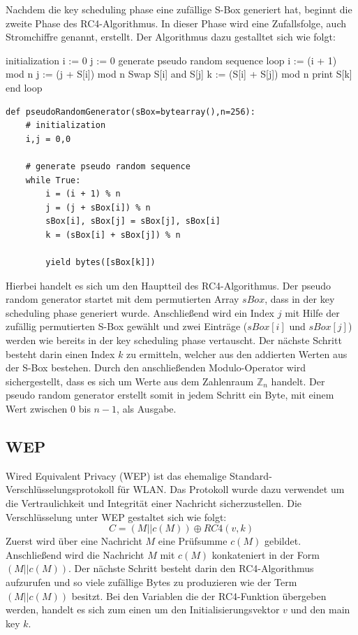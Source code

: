 \documentclass[10pt,a4paper]{article}
\begin{document}
Nachdem die key scheduling phase eine zufällige S-Box generiert hat, beginnt die zweite Phase des RC4-Algorithmus. In dieser Phase wird eine Zufallsfolge, auch Stromchiffre genannt, erstellt. Der Algorithmus dazu gestalltet sich wie folgt:
\begin{center}
\hspace{5pt}
\begin{minipage}[t]{.35\textwidth}
\begin{algorithm}
{initialization}
i := 0
j := 0
{generate pseudo random sequence}
loop
    i := (i + 1) mod n
    j := (j + S[i]) mod n
    Swap S[i] and S[j]
    k := (S[i] + S[j]) mod n
    print S[k]
end loop
\end{algorithm}
\end{minipage}\hspace{0.4cm}
\begin{minipage}[t]{.60\textwidth}
\begin{lstlisting}
def pseudoRandomGenerator(sBox=bytearray(),n=256):
   	# initialization
	i,j = 0,0

	# generate pseudo random sequence
	while True:
   		i = (i + 1) % n
   		j = (j + sBox[i]) % n
   		sBox[i], sBox[j] = sBox[j], sBox[i]
   		k = (sBox[i] + sBox[j]) % n

   		yield bytes([sBox[k]])
\end{lstlisting}
\end{minipage}
\end{center}
Hierbei handelt es sich um den Hauptteil des RC4-Algorithmus.  Der pseudo random generator startet mit dem permutierten Array $sBox$, dass in der key scheduling phase generiert wurde. Anschließend wird ein Index $j$ mit Hilfe der zufällig permutierten S-Box gewählt und zwei Einträge ($sBox[i]$ und $sBox[j]$) werden wie bereits in der key scheduling phase vertauscht. Der nächste Schritt besteht darin einen Index $k$ zu ermitteln, welcher aus den addierten Werten aus der S-Box bestehen. Durch den anschließenden Modulo-Operator wird sichergestellt, dass es sich um Werte aus dem Zahlenraum $\mathbb{Z}_n$ handelt. Der pseudo random generator erstellt somit in jedem Schritt ein Byte, mit einem Wert zwischen $0$ bis $n-1$, als Ausgabe.

\subsection{WEP}
Wired Equivalent Privacy (WEP) ist das ehemalige Standard-Verschlüsselungsprotokoll für WLAN. Das Protokoll wurde dazu verwendet um die Vertraulichkeit und Integrität einer Nachricht sicherzustellen. Die Verschlüsselung unter WEP gestaltet sich wie folgt:
$$
C = (M || c(M)) \oplus RC4(v,k)
$$
Zuerst wird über eine Nachricht $M$ eine Prüfsumme $c(M)$ gebildet. Anschließend wird die Nachricht $M$ mit $c(M)$ konkateniert in der Form $(M || c(M))$. Der nächste Schritt besteht darin den RC4-Algorithmus aufzurufen und so viele zufällige Bytes zu produzieren wie der Term $(M || c(M))$ besitzt. Bei den Variablen die der RC4-Funktion übergeben werden, handelt es sich zum einen um den Initialisierungsvektor $v$ und den main key $k$.
\end{document}
